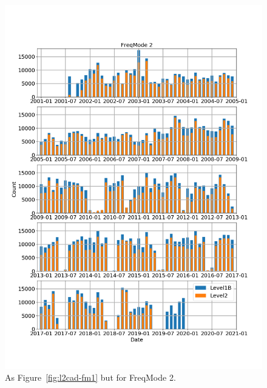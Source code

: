 \begin{figure}[t]
\centering
\includegraphics[width=1.0\textwidth]{l2cad-fm2.png}
\caption{As Figure~\ref{fig:l2cad-fm1} but for FreqMode 2.}
\label{fig:l2cad-fm8}
\end{figure}

